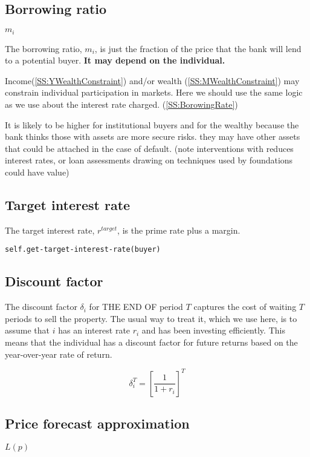 \subsection{Borrowing ratio} \label{SS:BorrowingRatio}
$m_i$

The borrowing ratio, $m_i$, is just the fraction of the price that the bank will lend to a potential buyer. \textbf{It may depend on the individual.} 

Income(\ref{SS:YWealthConstraint}) and/or wealth (\ref {SS:MWealthConstraint}) may constrain individual participation in markets. 
Here we should use the same logic as we use about the interest rate charged. (\ref{SS:BorowingRate})

It is likely to be higher for institutional buyers  and for the wealthy because the bank thinks those with assets are more secure risks. they may have other assets that could be attached in the case of default.
(note interventions with reduces interest rates, or loan assessments drawing on techniques used by foundations could have value)


\subsection{Target interest rate}\label{SS:targetr}

 The target interest rate, $r^{target}$, is the prime rate plus a margin. %

\begin{verbatim}
self.get-target-interest-rate(buyer)
\end{verbatim}



\subsection{Discount factor}\label{SS:discountfactor}

The discount factor $\delta_i$ for THE END OF period $T$ captures the cost of waiting $T$ periods to sell the property. The usual way to treat it, which we use here, is to assume that $i$ has an interest rate $r_i$ and has been investing efficiently. This means that  the individual has a discount factor for future returns based on the year-over-year rate of return. 

\[\delta^T_i=\left[\frac{1}{1+r_i}\right]^T\]



\subsection{Price forecast approximation} \label{SS:PriceForecast}
$L(p)$

